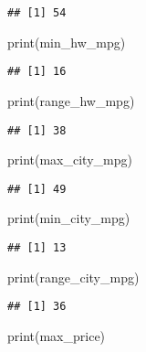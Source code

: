 \documentclass[
]{article}
\newenvironment{Shaded}{\begin{snugshade}}{\end{snugshade}}
\newcommand{\FunctionTok}[1]{\textcolor[rgb]{0.00,0.00,0.00}{#1}}
\newcommand{\NormalTok}[1]{#1}
\begin{document}
\begin{verbatim}
## [1] 54
\end{verbatim}

\begin{Shaded}
\begin{Highlighting}[]
\FunctionTok{print}\NormalTok{(min\_hw\_mpg)}
\end{Highlighting}
\end{Shaded}

\begin{verbatim}
## [1] 16
\end{verbatim}

\begin{Shaded}
\begin{Highlighting}[]
\FunctionTok{print}\NormalTok{(range\_hw\_mpg)}
\end{Highlighting}
\end{Shaded}

\begin{verbatim}
## [1] 38
\end{verbatim}

\begin{Shaded}
\begin{Highlighting}[]
\FunctionTok{print}\NormalTok{(max\_city\_mpg)}
\end{Highlighting}
\end{Shaded}

\begin{verbatim}
## [1] 49
\end{verbatim}

\begin{Shaded}
\begin{Highlighting}[]
\FunctionTok{print}\NormalTok{(min\_city\_mpg)}
\end{Highlighting}
\end{Shaded}

\begin{verbatim}
## [1] 13
\end{verbatim}

\begin{Shaded}
\begin{Highlighting}[]
\FunctionTok{print}\NormalTok{(range\_city\_mpg)}
\end{Highlighting}
\end{Shaded}

\begin{verbatim}
## [1] 36
\end{verbatim}

\begin{Shaded}
\begin{Highlighting}[]
\FunctionTok{print}\NormalTok{(max\_price)}
\end{Highlighting}
\end{Shaded}
\end{document}
